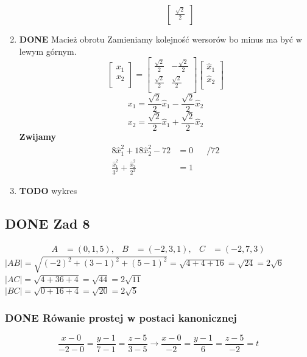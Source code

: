 \documentclass[11pt]{article}
\begin{document}
\begin{enumerate}
\begin{enumerate}
\begin{enumerate}
\[\begin{bmatrix}
                   \frac{\sqrt{2}}{2}\\
                 \end{bmatrix}\]
\end{enumerate}
\end{enumerate}
\item {\bfseries\sffamily DONE} Macież obrotu
\label{sec:orgfe01950}
Zamieniamy kolejność wersorów bo minus ma być w lewym górnym.
\[\begin{bmatrix}
x_{1}\\
x_{2}\\
\end{bmatrix} =\begin{bmatrix}
\frac{\sqrt{2}}{2} & -\frac{\sqrt{2}}{2}\\
\frac{\sqrt{2}}{2} & \frac{\sqrt{2}}{2}\\
\end{bmatrix}  \begin{bmatrix}
\hat{x}_{1}\\
\hat{x}_{2}\\
\end{bmatrix}\]
\[x_1 = \frac{\sqrt{2}}{2} \hat{x}_{1} - \frac{\sqrt{2}}{2} \hat{x}_2\]
\[x_2 = \frac{\sqrt{2}}{2} \hat{x}_{1} + \frac{\sqrt{2}}{2} \hat{x}_2\]
\textbf{Zwijamy}
\begin{align*}
  8 \hat{x}_1^2 + 18 \hat{x}_2^2 -72 &= 0 && / 72\\
  \frac{\hat{x}_{1}^{2}}{3^{2}} + \frac{\hat{x}_{2}^{2}}{2^{2}} &= 1
\end{align*}
\item {\bfseries\sffamily TODO} wykres
\label{sec:orgb07b395}
\end{enumerate}
\subsection{{\bfseries\sffamily DONE} Zad 8}
\label{sec:orga7fd048}
\begin{align*}
A&=(0,1,5),& B&=(-2,3,1),& C&=(-2, 7,3)
\end{align*}
\(|AB| = \sqrt{(-2)^{2} + (3-1)^{2} + (5 -1)^{2}} = \sqrt{4 + 4 +16} = \sqrt{24} = 2\sqrt{6}\)
\\\empty
\(|AC| = \sqrt{ 4 + 36 + 4} = \sqrt{44} = 2 \sqrt{11}\)
\\\empty
\(|BC| = \sqrt{0 + 16 + 4} = \sqrt{20} = 2\sqrt{5}\)
\subsubsection{{\bfseries\sffamily DONE} Rówanie prostej w postaci kanonicznej}
\label{sec:orgeed9170}
$$\frac{x - 0}{-2 - 0} = \frac{y - 1}{7 - 1} = \frac{z - 5}{3 -5}
\to \frac{x - 0}{-2} = \frac{y - 1}{6} = \frac{z - 5}{-2}
= t$$
\end{document}
